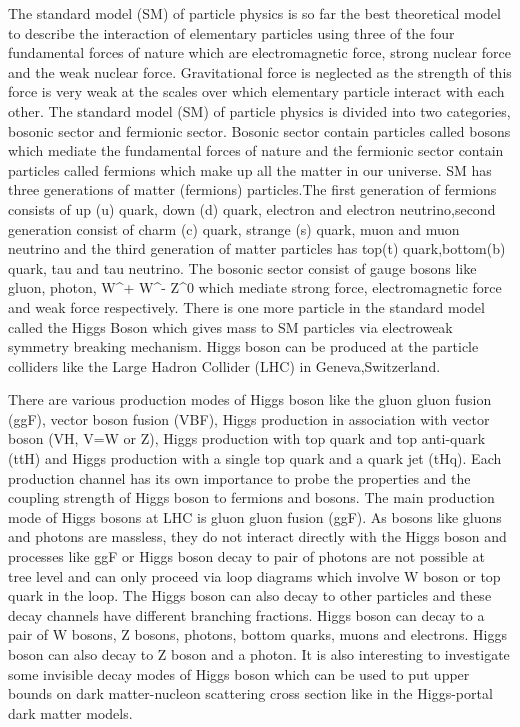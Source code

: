 \documentclass[final,3p]{CSP}
\begin{document}
The standard model (SM) of particle physics is so far the best theoretical model to describe the interaction of elementary 
particles using three of the four fundamental forces of nature which are electromagnetic force, strong nuclear force and the weak
nuclear force. Gravitational force is neglected as the strength of this force is very weak at the scales over which elementary 
particle interact with each other. The standard model (SM) of particle physics is divided into two categories, bosonic sector 
and fermionic sector. Bosonic sector contain particles called bosons which mediate the fundamental forces of nature and the
fermionic sector contain particles called fermions which make up all the matter in our universe. SM has three generations of 
matter (fermions) particles.The first generation of fermions consists of up (u) quark, down (d) quark, electron and electron 
neutrino,second generation consist of charm (c) quark, strange (s) quark, muon and muon neutrino and the third generation of matter 
particles has top(t) quark,bottom(b) quark, tau and tau neutrino. The bosonic sector consist of gauge bosons like gluon, photon, 
W^+ W^- Z^0 which mediate strong force, electromagnetic force and weak force respectively. There is one more particle in the 
standard model called the Higgs Boson which gives mass to SM particles via electroweak symmetry breaking mechanism. Higgs boson 
can be produced at the particle colliders like the Large Hadron Collider (LHC) in Geneva,Switzerland. 

There are various production modes of Higgs boson like the gluon gluon fusion (ggF), vector boson fusion (VBF), Higgs production 
in association with vector boson (VH, V=W or Z), Higgs production with top quark and top anti-quark (ttH) and Higgs production with 
a single top quark and a quark jet (tHq). Each production channel has its own importance to probe the properties and the coupling 
strength of Higgs boson to fermions and bosons. The main production mode of Higgs bosons at LHC is gluon gluon fusion (ggF). As 
bosons like gluons and photons are massless, they do not interact directly with the Higgs boson and processes like ggF or Higgs 
boson decay to pair of photons are not possible at tree level and can only proceed via loop diagrams which involve W boson or top 
quark in the loop. The Higgs boson can also decay to other particles and these decay channels have different branching fractions. 
Higgs boson can decay to a pair of W bosons, Z bosons, photons, bottom quarks, muons and electrons. Higgs boson can also decay to 
Z boson and a photon. It is also interesting to investigate some invisible decay modes of Higgs boson which can be used to put 
upper bounds on dark matter-nucleon scattering cross section like in the Higgs-portal dark matter models. 
\end{document}
